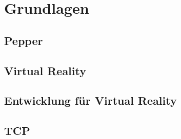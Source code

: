 \chapter{Grundlagen}
\section{Pepper}
\section{Virtual Reality}
\section{Entwicklung für Virtual Reality}
\section{TCP}